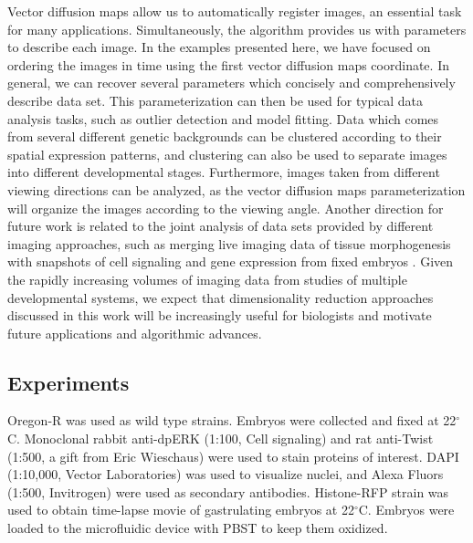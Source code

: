\documentclass{pnastwo}
\begin{document}
\begin{article}
Vector diffusion maps allow us to automatically register images, an essential task for many applications.
%
Simultaneously, the algorithm provides us with parameters to describe each image.
%
In the examples presented here, we have focused on ordering the images in time using the first vector diffusion maps coordinate.
%
In general, we can recover several parameters which concisely and comprehensively describe data set.
%
This parameterization can then be used for typical data analysis tasks, such as outlier detection and model fitting.
%
Data which comes from several different genetic backgrounds can be clustered according to their spatial expression patterns, and clustering can also be used to separate images into different developmental stages. 
%
Furthermore, images taken from different viewing directions can be analyzed, as the vector diffusion maps parameterization will organize the images according to the viewing angle.
%
Another direction for future work is related to the joint analysis of data sets provided by different imaging approaches, such as merging live imaging data of tissue morphogenesis with snapshots of cell signaling and gene expression from fixed embryos \cite{krzic2012multiview, ichikawa2014live, rubel2010coupling}.  
%
Given the rapidly increasing volumes of imaging data from studies of multiple developmental systems, we expect that dimensionality reduction approaches discussed in this work will be increasingly useful for biologists and motivate future applications and algorithmic advances. 
  





\begin{materials}

\section{Experiments}
%
Oregon-R was used as wild type strains. 
%
Embryos were collected and fixed at 22$^\circ$C. 
%
Monoclonal rabbit anti-dpERK (1:100, Cell signaling) and rat anti-Twist (1:500, a gift from Eric Wieschaus) were used to stain proteins of interest. 
%
DAPI (1:10,000, Vector Laboratories) was used to visualize nuclei, and Alexa Fluors (1:500, Invitrogen) were used as secondary antibodies. 
%
Histone-RFP strain was used to obtain time-lapse movie of gastrulating embryos at 22$^\circ$C. 
%
Embryos were loaded to the microfluidic device with PBST to keep them oxidized. 


\end{materials}
\end{article}
\end{document}
